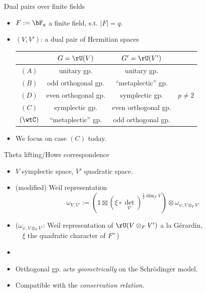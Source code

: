\documentclass[t,mathserif,11pt,usenames,dvipsnames]{beamer}
\theoremstyle{plain}
\theoremstyle{definition}
\newcommand{\bbone}{\mathbb{1}}
\def\abs#1{\left|{#1}\right|}
\def\half{{\frac{1}{2}}}
\def\blue{\color{blue}}
\let\oldemph\emph
\def\emph#1{\oldemph{\blue #1}}
\begin{document}
\begin{frame}{Dual pairs over finite fields}
  \begin{itemize}
    \item $F:= \bF_q$ a finite field, s.t. $\abs{F} = q$.
    \item $(V,V')$: a dual pair of Hermitian spaces\\
          \begin{tabular}{c|c|c|c}
            \hline
            & $G = \rU(V)$ & $G' = \rU(V')$ &  \\
            \hline
            \hline
            $(A)$ & unitary gp. & unitary gp. &  \\
            \hline
            $(B)$ & odd orthogonal gp. & ``metaplectic'' gp. &  \\
            $(D)$ & even orthogonal  gp. & symplectic gp. &  $p\neq 2$  \\
            $(C)$ &  symplectic gp. & even orthogonal gp.  &   \\
            $(\wtC)$ & ``metaplectic'' gp. & odd orthogonal gp. & \\
            \hline
          \end{tabular}
          \pause
    \item We focus on case $(C)$ today.
  \end{itemize}
\end{frame}




\begin{frame}{Theta lifting/Howe correspondence}
  \begin{itemize}
    \item $V$ symplectic space, $V'$ quadratic space.
    \item (modified) Weil representation
          \[
          \omega_{V,V'}:=
            \left(\bbone \boxtimes (\xi\circ {\det}_{V'})^{\half\dim_F V} \right)\otimes
            \omega_{\psi, V\otimes_F V'}
          \]
    \item[] ($\omega_{\psi, V\otimes_{F} V'}$: Weil representation of
          $\rU(V\otimes_F V')$ a la  G\'erardin,\\
          \ \ $\xi$ the quadratic character of $ F^\times$)
    \item[]
    \item Orthogonal gp. acts \emph{geometrically} on the Schr\"odinger model.
    \item Compatible with the \emph{conservation relation}.
  \end{itemize}
\end{frame}
\end{document}
